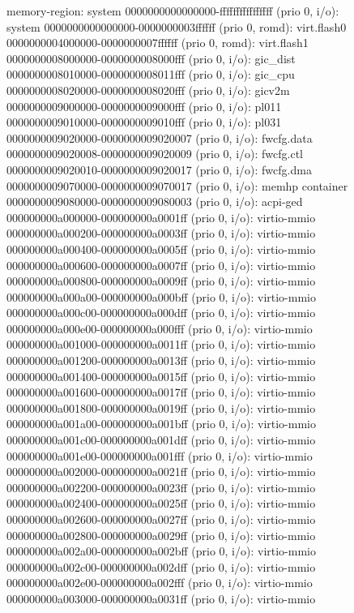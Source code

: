\begin{figure} [ht]
\begin{ffcode}
    memory-region: system
      0000000000000000-ffffffffffffffff (prio 0, i/o): system
        0000000000000000-0000000003ffffff (prio 0, romd): virt.flash0
        0000000004000000-0000000007ffffff (prio 0, romd): virt.flash1
        0000000008000000-0000000008000fff (prio 0, i/o): gic_dist
        0000000008010000-0000000008011fff (prio 0, i/o): gic_cpu
        0000000008020000-0000000008020fff (prio 0, i/o): gicv2m
        0000000009000000-0000000009000fff (prio 0, i/o): pl011
        0000000009010000-0000000009010fff (prio 0, i/o): pl031
        0000000009020000-0000000009020007 (prio 0, i/o): fwcfg.data
        0000000009020008-0000000009020009 (prio 0, i/o): fwcfg.ctl
        0000000009020010-0000000009020017 (prio 0, i/o): fwcfg.dma
        0000000009070000-0000000009070017 (prio 0, i/o): memhp container
        0000000009080000-0000000009080003 (prio 0, i/o): acpi-ged
        000000000a000000-000000000a0001ff (prio 0, i/o): virtio-mmio
        000000000a000200-000000000a0003ff (prio 0, i/o): virtio-mmio
        000000000a000400-000000000a0005ff (prio 0, i/o): virtio-mmio
        000000000a000600-000000000a0007ff (prio 0, i/o): virtio-mmio
        000000000a000800-000000000a0009ff (prio 0, i/o): virtio-mmio
        000000000a000a00-000000000a000bff (prio 0, i/o): virtio-mmio
        000000000a000c00-000000000a000dff (prio 0, i/o): virtio-mmio
        000000000a000e00-000000000a000fff (prio 0, i/o): virtio-mmio
        000000000a001000-000000000a0011ff (prio 0, i/o): virtio-mmio
        000000000a001200-000000000a0013ff (prio 0, i/o): virtio-mmio
        000000000a001400-000000000a0015ff (prio 0, i/o): virtio-mmio
        000000000a001600-000000000a0017ff (prio 0, i/o): virtio-mmio
        000000000a001800-000000000a0019ff (prio 0, i/o): virtio-mmio
        000000000a001a00-000000000a001bff (prio 0, i/o): virtio-mmio
        000000000a001c00-000000000a001dff (prio 0, i/o): virtio-mmio
        000000000a001e00-000000000a001fff (prio 0, i/o): virtio-mmio
        000000000a002000-000000000a0021ff (prio 0, i/o): virtio-mmio
        000000000a002200-000000000a0023ff (prio 0, i/o): virtio-mmio
        000000000a002400-000000000a0025ff (prio 0, i/o): virtio-mmio
        000000000a002600-000000000a0027ff (prio 0, i/o): virtio-mmio
        000000000a002800-000000000a0029ff (prio 0, i/o): virtio-mmio
        000000000a002a00-000000000a002bff (prio 0, i/o): virtio-mmio
        000000000a002c00-000000000a002dff (prio 0, i/o): virtio-mmio
        000000000a002e00-000000000a002fff (prio 0, i/o): virtio-mmio
        000000000a003000-000000000a0031ff (prio 0, i/o): virtio-mmio

\end{ffcode}
\end{figure}
